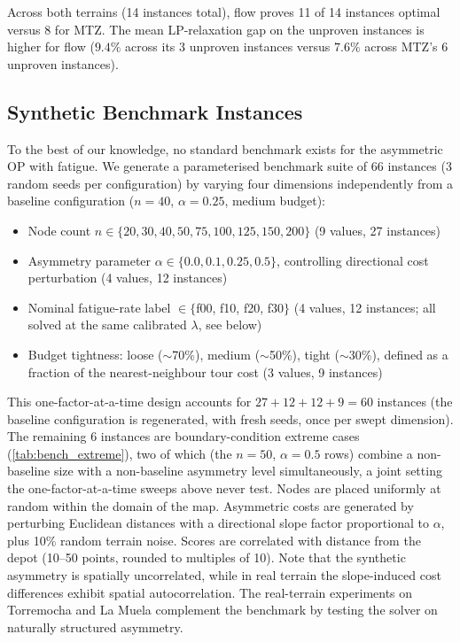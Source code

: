 \documentclass[11pt,a4paper]{article}
\begin{document}
Across both terrains (14 instances total), flow proves 11 of 14 instances optimal versus 8 for MTZ.
The mean LP-relaxation gap on the unproven instances is higher for flow ($9.4\%$ across its 3 unproven instances versus $7.6\%$ across MTZ's 6 unproven instances).

\subsection{Synthetic Benchmark Instances}
\label{sec:benchmark}

To the best of our knowledge, no standard benchmark exists for the asymmetric OP with fatigue.
We generate a parameterised benchmark suite of 66 instances (3 random seeds per configuration) by varying four dimensions independently from a baseline configuration ($n = 40$, $\alpha = 0.25$, medium budget):
\begin{itemize}[nosep]
  \item Node count $n \in \{20, 30, 40, 50, 75, 100, 125, 150, 200\}$ (9 values, 27 instances)
  \item Asymmetry parameter $\alpha \in \{0.0, 0.1, 0.25, 0.5\}$, controlling directional cost perturbation (4 values, 12 instances)
  \item Nominal fatigue-rate label $\in \{$f00, f10, f20, f30$\}$ (4 values, 12 instances; all solved at the same calibrated $\lambda$, see below)
  \item Budget tightness: loose ($\sim$70\%), medium ($\sim$50\%), tight ($\sim$30\%), defined as a fraction of the nearest-neighbour tour cost (3 values, 9 instances)
\end{itemize}
This one-factor-at-a-time design accounts for $27+12+12+9 = 60$ instances (the baseline configuration is regenerated, with fresh seeds, once per swept dimension).
The remaining 6 instances are boundary-condition extreme cases (\cref{tab:bench_extreme}), two of which (the $n=50$, $\alpha=0.5$ rows) combine a non-baseline size with a non-baseline asymmetry level simultaneously, a joint setting the one-factor-at-a-time sweeps above never test.
Nodes are placed uniformly at random within the domain of the map.
Asymmetric costs are generated by perturbing Euclidean distances with a directional slope factor proportional to $\alpha$, plus 10\% random terrain noise.
Scores are correlated with distance from the depot (10--50 points, rounded to multiples of 10).
Note that the synthetic asymmetry is spatially uncorrelated, while in real terrain the slope-induced cost differences exhibit spatial autocorrelation. The real-terrain experiments on Torremocha and La Muela complement the benchmark by testing the solver on naturally structured asymmetry.
\end{document}
